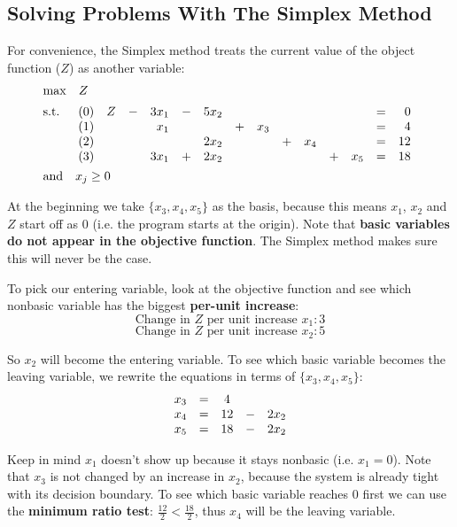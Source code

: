 \documentclass[12pt]{article}
\begin{document}
\subsection*{Solving Problems With The Simplex Method}
For convenience, the Simplex method treats the current value of the object function ($Z$) as another variable:
\begin{align*}
    &\mathrm{max} \quad Z \\[2pt]
    &\mathrm{s.t.} \quad 
    \begin{array}[t]{c r c r c r c r c r c r c r}
        (0) & Z & - & 3x_1 & - & 5x_2 & & & & & & & = & 0 \\
        (1) & & & x_1 & & & + & x_3 & & & & & = & 4 \\
        (2) & & & & & 2x_2 & & & + & x_4 & & & = & 12 \\
        (3) & & & 3x_1 & + & 2x_2 & & & & & + & x_5 & = & 18
    \end{array}\\
    &\mathrm{and} \quad x_j \geq 0
\end{align*}

\noindent
At the beginning we take $\{ x_3, x_4, x_5 \}$ as the basis, because this means $x_1$, $x_2$ and $Z$ start off as 0 (i.e. the program starts at the origin).
Note that \textbf{basic variables do not appear in the objective function}.
The Simplex method makes sure this will never be the case.

\newpage
\noindent
To pick our entering variable, look at the objective function and see which nonbasic variable has the biggest \textbf{per-unit increase}:
\[ \text{Change in } Z \text{ per unit increase } x_1 : 3 \]
\[ \text{Change in } Z \text{ per unit increase } x_2 : 5 \]

\noindent
So $x_2$ will become the entering variable.
To see which basic variable becomes the leaving variable, we rewrite the equations in terms of $\{ x_3, x_4, x_5 \}$:
\begin{align*}
    \begin{array}[t]{c r c r c}
        x_3 & = & 4 & & \\
        x_4 & = & 12 & - & 2x_2 \\
        x_5 & = & 18 & - & 2x_2
    \end{array}
\end{align*}

\noindent
Keep in mind $x_1$ doesn't show up because it stays nonbasic (i.e. $x_1 = 0$).
Note that $x_3$ is not changed by an increase in $x_2$, because the system is already tight with its decision boundary.
To see which basic variable reaches 0 first we can use the \textbf{minimum ratio test}:
$\frac{12}{2} < \frac{18}{2}$, thus $x_4$ will be the leaving variable.
\end{document}
